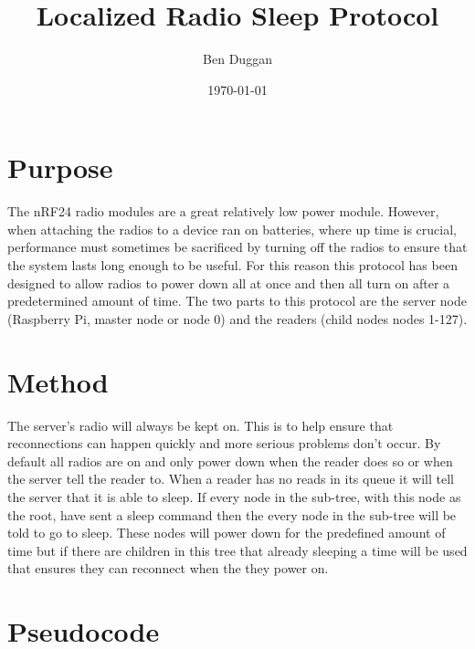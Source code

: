 \documentclass[12pt]{article}
\begin{document}
\title{\vspace{-3cm}Localized Radio Sleep Protocol}
\author{Ben Duggan}
\date{\today}
\maketitle

\section{Purpose}
The nRF24 radio modules are a great relatively low power module.  However, when attaching the radios to a device ran on batteries, where up time is crucial, performance must sometimes be sacrificed by turning off the radios to ensure that the system lasts long enough to be useful.  For this reason this protocol has been designed to allow radios to power down all at once and then all turn on after a predetermined amount of time.  The two parts to this protocol are the server node (Raspberry Pi, master node or node 0) and the readers (child nodes nodes 1-127).

\section{Method}
The server’s radio will always be kept on.  This is to help ensure that reconnections can happen quickly and more serious problems don’t occur.  By default all radios are on and only power down when the reader does so or when the server tell the reader to.  When a reader has no reads in its queue it will tell the server that it is able to sleep.  If every node in the sub-tree, with this node as the root, have sent a sleep command then the every node in the sub-tree will be told to go to sleep.  These nodes will power down for the predefined amount of time but if there are children in this tree that already sleeping a time will be used that ensures they can reconnect when the they power on.

\section{Pseudocode}
\end{document}
